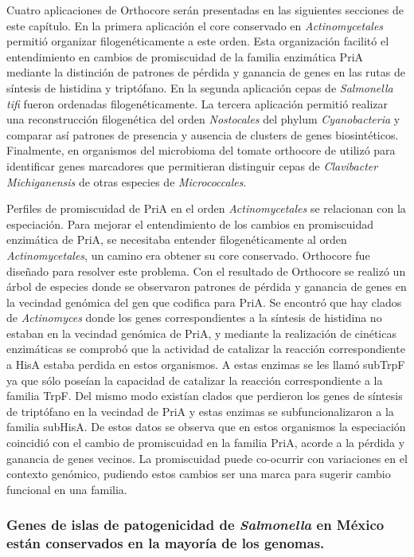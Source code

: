 \documentclass[]{article}
\begin{document}
Cuatro aplicaciones de Orthocore serán presentadas en las siguientes
secciones de este capítulo. En la primera aplicación el core conservado
en \emph{Actinomycetales} permitió organizar filogenéticamente a este
orden. Esta organización facilitó el entendimiento en cambios de
promiscuidad de la familia enzimática PriA mediante la distinción de
patrones de pérdida y ganancia de genes en las rutas de síntesis de
histidina y triptófano. En la segunda aplicación cepas de
\emph{Salmonella tifi} fueron ordenadas filogenéticamente. La tercera
aplicación permitió realizar una reconstrucción filogenética del orden
\emph{Nostocales} del phylum \emph{Cyanobacteria} y comparar así
patrones de presencia y ausencia de clusters de genes biosintéticos.
Finalmente, en organismos del microbioma del tomate orthocore de utilizó
para identificar genes marcadores que permitieran distinguir cepas de
\emph{Clavibacter Michiganensis} de otras especies de
\emph{Micrococcales}.

Perfiles de promiscuidad de PriA en el orden \emph{Actinomycetales} se
relacionan con la especiación. Para mejorar el entendimiento de los
cambios en promiscuidad enzimática de PriA, se necesitaba entender
filogenéticamente al orden \emph{Actinomycetales}, un camino era obtener
su core conservado. Orthocore fue diseñado para resolver este problema.
Con el resultado de Orthocore se realizó un árbol de especies donde se
observaron patrones de pérdida y ganancia de genes en la vecindad
genómica del gen que codifica para PriA. Se encontró que hay clados de
\emph{Actinomyces} donde los genes correspondientes a la síntesis de
histidina no estaban en la vecindad genómica de PriA, y mediante la
realización de cinéticas enzimáticas se comprobó que la actividad de
catalizar la reacción correspondiente a HisA estaba perdida en estos
organismos. A estas enzimas se les llamó subTrpF ya que sólo poseían la
capacidad de catalizar la reacción correspondiente a la familia TrpF.
Del mismo modo existían clados que perdieron los genes de síntesis de
triptófano en la vecindad de PriA y estas enzimas se subfuncionalizaron
a la familia subHisA. De estos datos se observa que en estos organismos
la especiación coincidió con el cambio de promiscuidad en la familia
PriA, acorde a la pérdida y ganancia de genes vecinos. La promiscuidad
puede co-ocurrir con variaciones en el contexto genómico, pudiendo estos
cambios ser una marca para sugerir cambio funcional en una familia.

\subsubsection{\texorpdfstring{Genes de islas de patogenicidad de
\emph{Salmonella} en México están conservados en la mayoría de los
genomas.}{Genes de islas de patogenicidad de Salmonella en México están conservados en la mayoría de los genomas.}}\label{genes-de-islas-de-patogenicidad-de-salmonella-en-mexico-estan-conservados-en-la-mayoria-de-los-genomas.}
\end{document}
